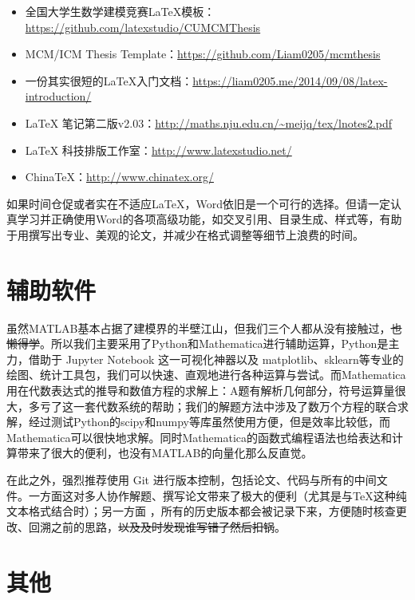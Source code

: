 \documentclass{ctexart}
\begin{document}
\begin{itemize}
  \item 全国大学生数学建模竞赛\LaTeX{}模板：\url{https://github.com/latexstudio/CUMCMThesis}
  \item MCM/ICM Thesis Template：\url{https://github.com/Liam0205/mcmthesis}
  \item 一份其实很短的\LaTeX{}入门文档：\url{https://liam0205.me/2014/09/08/latex-introduction/}
  \item \LaTeX{} 笔记第二版v2.03：\url{http://maths.nju.edu.cn/~meijq/tex/lnotes2.pdf}
  \item \LaTeX{} 科技排版工作室：\url{http://www.latexstudio.net/}
  \item China\TeX{}：\url{http://www.chinatex.org/}
\end{itemize}

如果时间仓促或者实在不适应\LaTeX{}，Word依旧是一个可行的选择。但请一定认真学习并正确使用Word的各项高级功能，如交叉引用、目录生成、样式等，有助于用撰写出专业、美观的论文，并减少在格式调整等细节上浪费的时间。

\section{辅助软件}
虽然MATLAB基本占据了建模界的半壁江山，但我们三个人都从没有接触过，\sout{也懒得学}。所以我们主要采用了Python和Mathematica进行辅助运算，Python是主力，借助于 Jupyter Notebook 这一可视化神器以及 matplotlib、sklearn等专业的绘图、统计工具包，我们可以快速、直观地进行各种运算与尝试。而Mathematica用在代数表达式的推导和数值方程的求解上：A题有解析几何部分，符号运算量很大，多亏了这一套代数系统的帮助；我们的解题方法中涉及了数万个方程的联合求解，经过测试Python的scipy和numpy等库虽然使用方便，但是效率比较低，而Mathematica可以很快地求解。同时Mathematica的函数式编程语法也给表达和计算带来了很大的便利，也没有MATLAB的向量化那么反直觉。

在此之外，强烈推荐使用 Git 进行版本控制，包括论文、代码与所有的中间文件。一方面这对多人协作解题、撰写论文带来了极大的便利（尤其是与\TeX{}这种纯文本格式结合时）；另一方面 ，所有的历史版本都会被记录下来，方便随时核查更改、回溯之前的思路，\sout{以及及时发现谁写错了然后扣锅}。

\section{其他}
\end{document}
